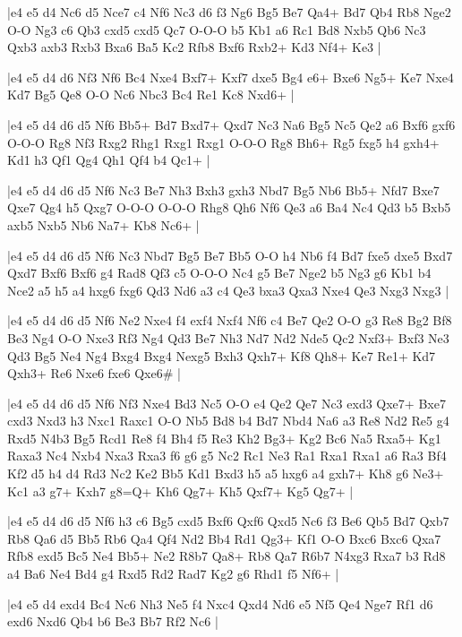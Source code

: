 \whitename{}
\blackname{}
\makegametitle
|e4 e5 d4 Nc6 d5 Nce7 c4 Nf6 Nc3 d6 f3 Ng6 Bg5 Be7 Qa4+ Bd7 Qb4 Rb8 Nge2 O-O Ng3 c6 Qb3 cxd5 cxd5 Qc7 O-O-O b5 Kb1 a6 Rc1 Bd8 Nxb5 Qb6 Nc3 Qxb3 axb3 Rxb3 Bxa6 Ba5 Kc2 Rfb8 Bxf6 Rxb2+ Kd3 Nf4+ Ke3  |

\whitename{}
\blackname{}
\makegametitle
|e4 e5 d4 d6 Nf3 Nf6 Bc4 Nxe4 Bxf7+ Kxf7 dxe5 Bg4 e6+ Bxe6 Ng5+ Ke7 Nxe4 Kd7 Bg5 Qe8 O-O Nc6 Nbc3 Bc4 Re1 Kc8 Nxd6+  |

\whitename{}
\blackname{}
\makegametitle
|e4 e5 d4 d6 d5 Nf6 Bb5+ Bd7 Bxd7+ Qxd7 Nc3 Na6 Bg5 Nc5 Qe2 a6 Bxf6 gxf6 O-O-O Rg8 Nf3 Rxg2 Rhg1 Rxg1 Rxg1 O-O-O Rg8 Bh6+ Rg5 fxg5 h4 gxh4+ Kd1 h3 Qf1 Qg4 Qh1 Qf4 b4 Qc1+  |

\whitename{}
\blackname{}
\makegametitle
|e4 e5 d4 d6 d5 Nf6 Nc3 Be7 Nh3 Bxh3 gxh3 Nbd7 Bg5 Nb6 Bb5+ Nfd7 Bxe7 Qxe7 Qg4 h5 Qxg7 O-O-O O-O-O Rhg8 Qh6 Nf6 Qe3 a6 Ba4 Nc4 Qd3 b5 Bxb5 axb5 Nxb5 Nb6 Na7+ Kb8 Nc6+  |

\whitename{}
\blackname{}
\makegametitle
|e4 e5 d4 d6 d5 Nf6 Nc3 Nbd7 Bg5 Be7 Bb5 O-O h4 Nb6 f4 Bd7 fxe5 dxe5 Bxd7 Qxd7 Bxf6 Bxf6 g4 Rad8 Qf3 c5 O-O-O Nc4 g5 Be7 Nge2 b5 Ng3 g6 Kb1 b4 Nce2 a5 h5 a4 hxg6 fxg6 Qd3 Nd6 a3 c4 Qe3 bxa3 Qxa3 Nxe4 Qe3 Nxg3 Nxg3  |

\whitename{}
\blackname{}
\makegametitle
|e4 e5 d4 d6 d5 Nf6 Ne2 Nxe4 f4 exf4 Nxf4 Nf6 c4 Be7 Qe2 O-O g3 Re8 Bg2 Bf8 Be3 Ng4 O-O Nxe3 Rf3 Ng4 Qd3 Be7 Nh3 Nd7 Nd2 Nde5 Qc2 Nxf3+ Bxf3 Ne3 Qd3 Bg5 Ne4 Ng4 Bxg4 Bxg4 Nexg5 Bxh3 Qxh7+ Kf8 Qh8+ Ke7 Re1+ Kd7 Qxh3+ Re6 Nxe6 fxe6 Qxe6\#  |

\whitename{}
\blackname{}
\makegametitle
|e4 e5 d4 d6 d5 Nf6 Nf3 Nxe4 Bd3 Nc5 O-O e4 Qe2 Qe7 Nc3 exd3 Qxe7+ Bxe7 cxd3 Nxd3 h3 Nxc1 Raxc1 O-O Nb5 Bd8 b4 Bd7 Nbd4 Na6 a3 Re8 Nd2 Re5 g4 Rxd5 N4b3 Bg5 Rcd1 Re8 f4 Bh4 f5 Re3 Kh2 Bg3+ Kg2 Bc6 Na5 Rxa5+ Kg1 Raxa3 Nc4 Nxb4 Nxa3 Rxa3 f6 g6 g5 Nc2 Rc1 Ne3 Ra1 Rxa1 Rxa1 a6 Ra3 Bf4 Kf2 d5 h4 d4 Rd3 Nc2 Ke2 Bb5 Kd1 Bxd3 h5 a5 hxg6 a4 gxh7+ Kh8 g6 Ne3+ Kc1 a3 g7+ Kxh7 g8=Q+ Kh6 Qg7+ Kh5 Qxf7+ Kg5 Qg7+  |

\whitename{}
\blackname{}
\makegametitle
|e4 e5 d4 d6 d5 Nf6 h3 c6 Bg5 cxd5 Bxf6 Qxf6 Qxd5 Nc6 f3 Be6 Qb5 Bd7 Qxb7 Rb8 Qa6 d5 Bb5 Rb6 Qa4 Qf4 Nd2 Bb4 Rd1 Qg3+ Kf1 O-O Bxc6 Bxc6 Qxa7 Rfb8 exd5 Bc5 Ne4 Bb5+ Ne2 R8b7 Qa8+ Rb8 Qa7 R6b7 N4xg3 Rxa7 b3 Rd8 a4 Ba6 Ne4 Bd4 g4 Rxd5 Rd2 Rad7 Kg2 g6 Rhd1 f5 Nf6+  |

\whitename{}
\blackname{}
\makegametitle
|e4 e5 d4 exd4 Bc4 Nc6 Nh3 Ne5 f4 Nxc4 Qxd4 Nd6 e5 Nf5 Qe4 Nge7 Rf1 d6 exd6 Nxd6 Qb4 b6 Be3 Bb7 Rf2 Nc6  |

